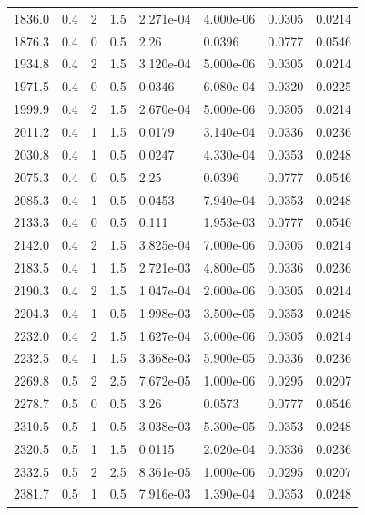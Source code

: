 \documentclass[preview]{standalone}
\begin{document}
{{{\begin{tabular}{L{1.2cm}C{1.2cm} C{0.3cm}C{0.5cm} C{1.4cm}C{1.4cm} C{1.4cm}C{1.4cm}}
  1836.0  &   0.4  & 2     & 1.5 &  2.271e-04  & 4.000e-06  & 0.0305 &  0.0214   \\ 
  1876.3  &   0.4  & 0     & 0.5 &  2.26  & 0.0396  & 0.0777 &  0.0546   \\ 
  1934.8  &   0.4  & 2     & 1.5 &  3.120e-04  & 5.000e-06  & 0.0305 &  0.0214   \\ 
  1971.5  &   0.4  & 0     & 0.5 &  0.0346  & 6.080e-04  & 0.0320 &  0.0225   \\ 
  1999.9  &   0.4  & 2     & 1.5 &  2.670e-04  & 5.000e-06  & 0.0305 &  0.0214   \\ 
  2011.2  &   0.4  & 1     & 1.5 &  0.0179  & 3.140e-04  & 0.0336 &  0.0236   \\ 
  2030.8  &   0.4  & 1     & 0.5 &  0.0247  & 4.330e-04  & 0.0353 &  0.0248   \\ 
  2075.3  &   0.4  & 0     & 0.5 &  2.25  & 0.0396  & 0.0777 &  0.0546   \\ 
  2085.3  &   0.4  & 1     & 0.5 &  0.0453  & 7.940e-04  & 0.0353 &  0.0248   \\ 
  2133.3  &   0.4  & 0     & 0.5 &  0.111  & 1.953e-03  & 0.0777 &  0.0546   \\ 
  2142.0  &   0.4  & 2     & 1.5 &  3.825e-04  & 7.000e-06  & 0.0305 &  0.0214   \\ 
  2183.5  &   0.4  & 1     & 1.5 &  2.721e-03  & 4.800e-05  & 0.0336 &  0.0236   \\ 
  2190.3  &   0.4  & 2     & 1.5 &  1.047e-04  & 2.000e-06  & 0.0305 &  0.0214   \\ 
  2204.3  &   0.4  & 1     & 0.5 &  1.998e-03  & 3.500e-05  & 0.0353 &  0.0248   \\ 
  2232.0  &   0.4  & 2     & 1.5 &  1.627e-04  & 3.000e-06  & 0.0305 &  0.0214   \\ 
  2232.5  &   0.4  & 1     & 1.5 &  3.368e-03  & 5.900e-05  & 0.0336 &  0.0236   \\ 
  2269.8  &   0.5  & 2     & 2.5 &  7.672e-05  & 1.000e-06  & 0.0295 &  0.0207   \\ 
  2278.7  &   0.5  & 0     & 0.5 &  3.26  & 0.0573  & 0.0777 &  0.0546   \\ 
  2310.5  &   0.5  & 1     & 0.5 &  3.038e-03  & 5.300e-05  & 0.0353 &  0.0248   \\ 
  2320.5  &   0.5  & 1     & 1.5 &  0.0115  & 2.020e-04  & 0.0336 &  0.0236   \\ 
  2332.5  &   0.5  & 2     & 2.5 &  8.361e-05  & 1.000e-06  & 0.0295 &  0.0207   \\ 
  2381.7  &   0.5  & 1     & 0.5 &  7.916e-03  & 1.390e-04  & 0.0353 &  0.0248   \\ 

\end{tabular}}}}
\end{document}
